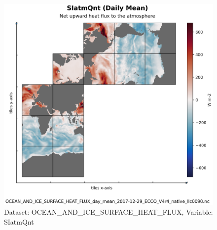 \begin{figure}[H]
\centering
\includegraphics[scale=0.55]{../images/plots/native_plots/Ocean_and_Sea-Ice_Surface_Heat_Fluxes/SIatmQnt.png}
\caption{Dataset: OCEAN\_AND\_ICE\_SURFACE\_HEAT\_FLUX, Variable: SIatmQnt}
\label{tab:table-OCEAN_AND_ICE_SURFACE_HEAT_FLUX_SIatmQnt-Plot}
\end{figure}
\pagebreak
